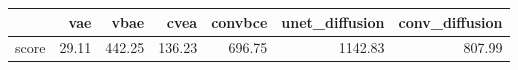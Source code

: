 \begin{tabular}{lrrrrrr}
\toprule
{} &   vae &   vbae &   cvea &  convbce &  unet\_diffusion &  conv\_diffusion \\
\midrule
score & 29.11 & 442.25 & 136.23 &   696.75 &         1142.83 &          807.99 \\
\bottomrule
\end{tabular}
